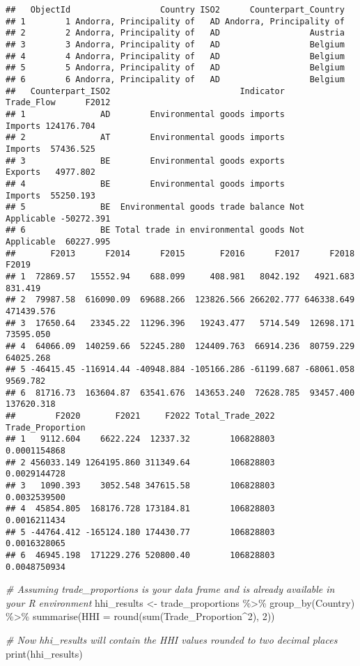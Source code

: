 \documentclass[
]{article}
\newenvironment{Shaded}{\begin{snugshade}}{\end{snugshade}}
\newcommand{\AttributeTok}[1]{\textcolor[rgb]{0.77,0.63,0.00}{#1}}
\newcommand{\CommentTok}[1]{\textcolor[rgb]{0.56,0.35,0.01}{\textit{#1}}}
\newcommand{\DecValTok}[1]{\textcolor[rgb]{0.00,0.00,0.81}{#1}}
\newcommand{\FunctionTok}[1]{\textcolor[rgb]{0.00,0.00,0.00}{#1}}
\newcommand{\NormalTok}[1]{#1}
\newcommand{\OtherTok}[1]{\textcolor[rgb]{0.56,0.35,0.01}{#1}}
\newcommand{\SpecialCharTok}[1]{\textcolor[rgb]{0.00,0.00,0.00}{#1}}
\begin{document}
\begin{verbatim}
##   ObjectId                  Country ISO2      Counterpart_Country
## 1        1 Andorra, Principality of   AD Andorra, Principality of
## 2        2 Andorra, Principality of   AD                  Austria
## 3        3 Andorra, Principality of   AD                  Belgium
## 4        4 Andorra, Principality of   AD                  Belgium
## 5        5 Andorra, Principality of   AD                  Belgium
## 6        6 Andorra, Principality of   AD                  Belgium
##   Counterpart_ISO2                          Indicator     Trade_Flow      F2012
## 1               AD        Environmental goods imports        Imports 124176.704
## 2               AT        Environmental goods imports        Imports  57436.525
## 3               BE        Environmental goods exports        Exports   4977.802
## 4               BE        Environmental goods imports        Imports  55250.193
## 5               BE  Environmental goods trade balance Not Applicable -50272.391
## 6               BE Total trade in environmental goods Not Applicable  60227.995
##       F2013      F2014      F2015       F2016      F2017      F2018      F2019
## 1  72869.57   15552.94    688.099     408.981   8042.192   4921.683    831.419
## 2  79987.58  616090.09  69688.266  123826.566 266202.777 646338.649 471439.576
## 3  17650.64   23345.22  11296.396   19243.477   5714.549  12698.171  73595.050
## 4  64066.09  140259.66  52245.280  124409.763  66914.236  80759.229  64025.268
## 5 -46415.45 -116914.44 -40948.884 -105166.286 -61199.687 -68061.058   9569.782
## 6  81716.73  163604.87  63541.676  143653.240  72628.785  93457.400 137620.318
##        F2020       F2021     F2022 Total_Trade_2022 Trade_Proportion
## 1   9112.604    6622.224  12337.32        106828803     0.0001154868
## 2 456033.149 1264195.860 311349.64        106828803     0.0029144728
## 3   1090.393    3052.548 347615.58        106828803     0.0032539500
## 4  45854.805  168176.728 173184.81        106828803     0.0016211434
## 5 -44764.412 -165124.180 174430.77        106828803     0.0016328065
## 6  46945.198  171229.276 520800.40        106828803     0.0048750934
\end{verbatim}

\begin{Shaded}
\begin{Highlighting}[]
\CommentTok{\# Assuming trade\_proportions is your data frame and is already available in your R environment}
\NormalTok{hhi\_results }\OtherTok{\textless{}{-}}\NormalTok{ trade\_proportions }\SpecialCharTok{\%\textgreater{}\%}
  \FunctionTok{group\_by}\NormalTok{(Country) }\SpecialCharTok{\%\textgreater{}\%}
  \FunctionTok{summarise}\NormalTok{(}\AttributeTok{HHI =} \FunctionTok{round}\NormalTok{(}\FunctionTok{sum}\NormalTok{(Trade\_Proportion}\SpecialCharTok{\^{}}\DecValTok{2}\NormalTok{), }\DecValTok{2}\NormalTok{))}

\CommentTok{\# Now hhi\_results will contain the HHI values rounded to two decimal places}
\FunctionTok{print}\NormalTok{(hhi\_results)}
\end{Highlighting}
\end{Shaded}
\end{document}
